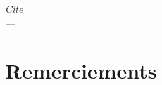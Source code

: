 
\begin{flushright}{\slshape    
  	 Cite \\ \medskip
  	 --- } 
\end{flushright}



\bigskip

\begingroup
\let\clearpage\relax
\let\cleardoublepage\relax
\let\cleardoublepage\relax
\chapter*{Remerciements}


\endgroup



